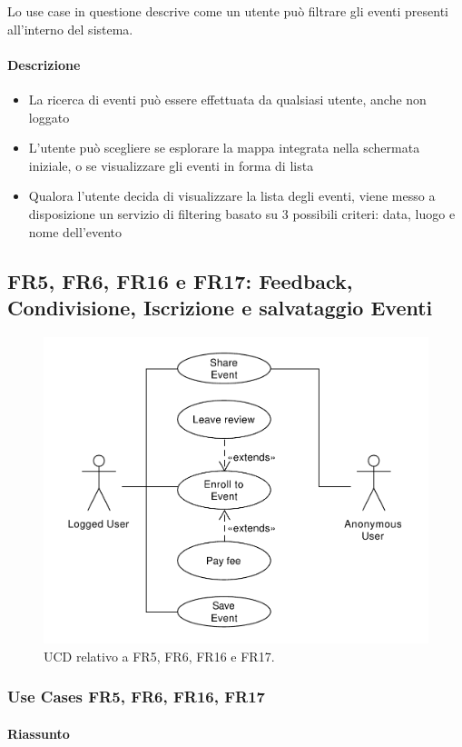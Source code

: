 \documentclass[9pt]{extarticle}
\begin{document}
Lo use case in questione descrive come un utente può filtrare gli eventi presenti all'interno del sistema.

\paragraph{Descrizione}

\begin{itemize}
	\item La ricerca di eventi può essere effettuata da qualsiasi utente, anche non loggato
	\item L'utente può scegliere se esplorare la mappa integrata nella schermata iniziale, o se visualizzare gli eventi in forma di lista
	\item Qualora l'utente decida di visualizzare la lista degli eventi, viene messo a disposizione un servizio di filtering basato su 3 possibili criteri: data, luogo e nome dell'evento
\end{itemize}

\subsection{FR5, FR6, FR16 e FR17: Feedback, Condivisione, Iscrizione e salvataggio Eventi}


\begin{figure}[!htb]
	\centering
	\includegraphics[width=.6\linewidth]{./images/FR5-6-16-17.pdf}
	\caption{UCD relativo a FR5, FR6, FR16 e FR17.}
	\label{fig:UCD_FR5-6-16-17}
\end{figure}

\subsubsection*{Use Cases FR5, FR6, FR16, FR17}

\paragraph{Riassunto}
\end{document}
